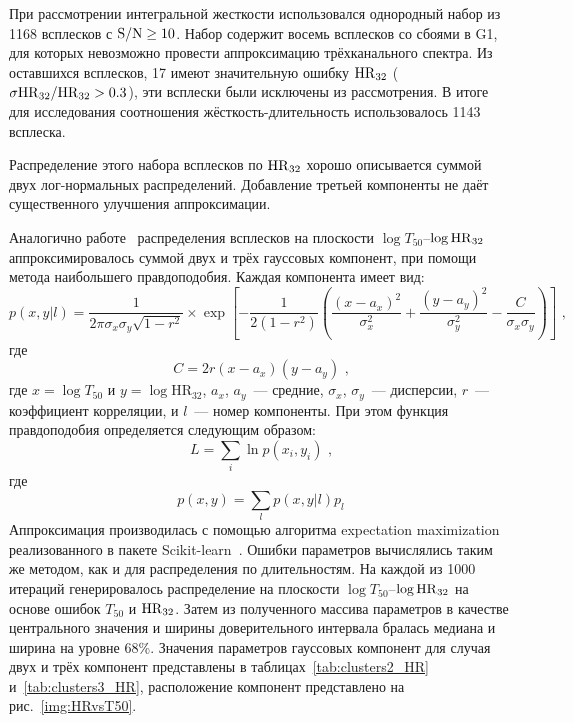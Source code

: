При рассмотрении интегральной жесткости использовался однородный набор из 1168 
всплесков с ${\mathrm{S/N}} \geq 10$. Набор содержит восемь всплесков со сбоями в G1, 
для которых невозможно провести аппроксимацию трёхканального спектра. 
Из оставшихся всплесков, 17 имеют значительную ошибку ${\mathrm{HR}}_{32}$ 
($\sigma{\mathrm{HR}}_{32}/{\mathrm{HR}}_{32} >0.3$), эти всплески были исключены из рассмотрения. 
В итоге для исследования соотношения жёсткость-длительность использовалось 1143 всплеска.

Распределение этого набора всплесков по ${\mathrm{HR}}_{32}$ хорошо описывается суммой двух 
лог-нормальных распределений. Добавление третьей компоненты не даёт существенного 
улучшения аппроксимации. 

Аналогично работе~\citep{Horvath_2006} распределения всплесков на 
плоскости $\log T_{50}$--$\log {\mathrm{HR}}_{32}$ аппроксимировалось суммой двух и трёх 
гауссовых компонент, при помощи метода наибольшего правдоподобия. Каждая компонента имеет вид: 
\begin{equation}
p(x,y| l) = \frac{1}{2\pi \sigma_x \sigma_y \sqrt{1-r^2}} \times 
\exp\left[ -\frac{1}{2(1-r^2)}\left( \frac{(x-a_x)^2}{\sigma_x^2} + 
\frac{(y-a_y)^2}{\sigma_y^2} -\frac{C}{\sigma_x \sigma_y}\right)\right]\mbox{ ,}
\end{equation}
где
\begin{equation}
C = 2r(x-a_x)(y-a_y)\mbox{ ,} \nonumber
\end{equation}
где $x=\log T_{50}$ и $y=\log \mbox{HR}_{32}$,  $a_x$, $a_y$~--- средние, 
$\sigma_x$, $\sigma_y$~--- дисперсии, $r$~--- коэффициент корреляции, 
и $l$~--- номер компоненты. При этом функция правдоподобия определяется следующим образом:
\begin{equation}
L = \sum_i \ln p(x_i, y_i)\mbox{ ,}
\end{equation}
где
\begin{equation}
p(x,y) = \sum_l  p(x, y|l)p_l \nonumber
\end{equation}
Аппроксимация производилась с помощью алгоритма 
expectation maximization~\citep{Horvath_2006, Balazs_2003AA} реализованного в пакете 
Scikit-learn~\citep{scikit-learn}. 
Ошибки параметров вычислялись таким же методом, как и для распределения по длительностям. 
На каждой из 1000 итераций генерировалось распределение на плоскости  
$\log T_{50}$--$\log{\mathrm{HR}}_{32}$ на основе ошибок $T_{50}$ и ${\mathrm{HR}}_{32}$. 
Затем из полученного массива параметров в качестве центрального значения и ширины доверительного 
интервала бралась медиана и ширина на уровне 68\%. Значения параметров гауссовых компонент 
для случая двух и трёх компонент представлены в таблицах~\ref{tab:clusters2_HR} 
и~\ref{tab:clusters3_HR}, расположение компонент представлено на рис.~\ref{img:HRvsT50}. 

